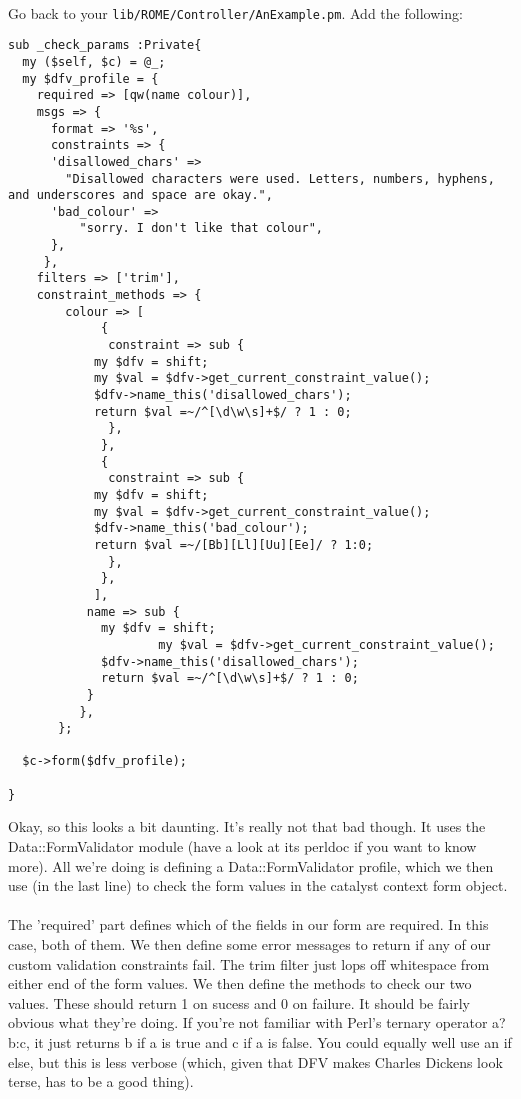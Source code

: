 \paragraph*{}
Go back to your \verb|lib/ROME/Controller/AnExample.pm|. Add the following:

\begin{verbatim}
sub _check_params :Private{
  my ($self, $c) = @_;
  my $dfv_profile = {
	required => [qw(name colour)],
	msgs => {
  	  format => '%s',
	  constraints => {
	  'disallowed_chars' => 
	    "Disallowed characters were used. Letters, numbers, hyphens, and underscores and space are okay.",
	  'bad_colour' => 
	      "sorry. I don't like that colour",
	  },
	 },
	filters => ['trim'],  
	constraint_methods => {
	    colour => [
		     {
		      constraint => sub {
			my $dfv = shift;
			my $val = $dfv->get_current_constraint_value();
			$dfv->name_this('disallowed_chars');
			return $val =~/^[\d\w\s]+$/ ? 1 : 0;
		      },
		     },
		     {
		      constraint => sub {
			my $dfv = shift;
			my $val = $dfv->get_current_constraint_value();
			$dfv->name_this('bad_colour');
			return $val =~/[Bb][Ll][Uu][Ee]/ ? 1:0;
		      },
		     },
		    ],	
		   name => sub {
		     my $dfv = shift;
                     my $val = $dfv->get_current_constraint_value();
		     $dfv->name_this('disallowed_chars');
		     return $val =~/^[\d\w\s]+$/ ? 1 : 0;
		   }
		  },
       };
  
  $c->form($dfv_profile);
  
}

\end{verbatim}

Okay, so this looks a bit daunting. It's really not that bad though. It uses the Data::FormValidator module (have a look at its perldoc if you want to know more). All we're doing is defining a Data::FormValidator profile, which we then use (in the last line) to check the form values in the catalyst context form object. 

\paragraph*{}
The 'required' part defines which of the fields in our form are required. In this case, both of them. We then define some error messages to return if any of our custom validation constraints fail. The trim filter just lops off whitespace from either end of the form values. We then define the methods to check our two values. These should return 1 on sucess and 0 on failure. It should be fairly obvious what they're doing. If you're not familiar with Perl's ternary operator a?b:c, it just returns b if a is true and c if a is false. You could equally well use an if else, but this is less verbose (which, given that DFV makes Charles Dickens look terse, has to be a good thing).

